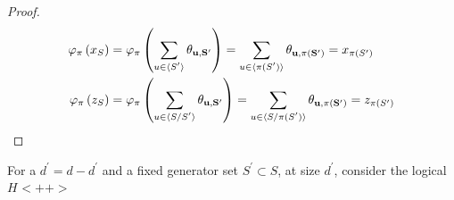 \begin{proof}
\begin{equation*}
  \begin{split}
    \varphi_{\pi}\left( x_{S}  \right) &= \varphi_{\pi}\left( \sum_{u\in \expval*{S^{\prime}}}\mathbf{\theta_{u ,S^{\prime}} }  \right) =  \sum_{u\in \expval*{\pi(S^{\prime})}}\mathbf{\theta_{u ,\pi(S^{\prime})} } = x_{\pi(S^{\prime})} \\
    \varphi_{\pi}\left( z_{S}  \right) &= \varphi_{\pi}\left( \sum_{u\in \expval*{S/S^{\prime}}}\mathbf{\theta_{u ,S^{\prime}} }  \right) =  \sum_{u\in \expval*{S/\pi(S^{\prime})}}\mathbf{\theta_{u ,\pi(S^{\prime})} } = z_{\pi(S^{\prime})} \\
  \end{split}
\end{equation*}
\end{proof}
\begin{corollary}
  For a $d^{\prime} = d - d^{\prime}$ and a fixed generator set $S^{\prime}\subset S$, at size $d^{\prime}$, consider the logical $H_{}<++>$ 
\end{corollary}


